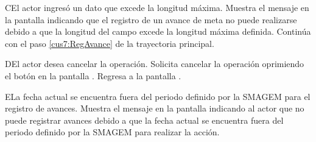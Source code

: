     \begin{UCtrayectoriaA}{C}{El actor ingresó un dato que excede la longitud máxima.}    
    \UCpaso[\UCsist] Muestra el mensaje  en la pantalla  indicando que el registro de un avance de meta no puede realizarse debido a que la longitud del campo excede la longitud máxima definida.
    \UCpaso[] Continúa con el paso \ref{cus7:RegAvance} de la trayectoria principal.     
    \end{UCtrayectoriaA}
 
     \begin{UCtrayectoriaA}{D}{El actor desea cancelar la operación.}
      \UCpaso[\UCactor] Solicita cancelar la operación oprimiendo el botón  en la pantalla .
      \UCpaso[\UCsist] Regresa a la pantalla . 
    \end{UCtrayectoriaA}

    \begin{UCtrayectoriaA}{E}{La fecha actual se encuentra fuera del periodo definido por la SMAGEM para el registro de avances.}
    \UCpaso[\UCsist] Muestra el mensaje  en la pantalla  indicando al actor que no puede registrar avances debido a que la fecha actual se encuentra fuera del periodo definido por la SMAGEM para realizar la acción. 
    \end{UCtrayectoriaA}